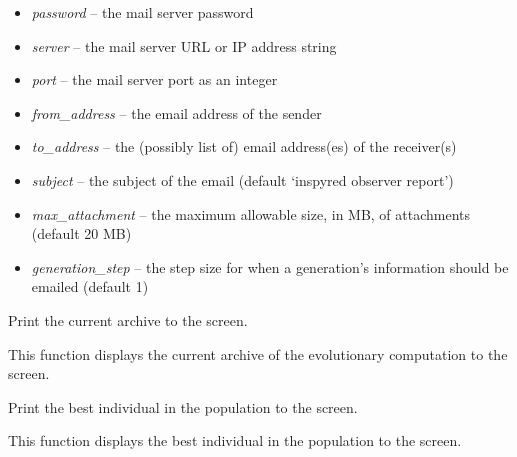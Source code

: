 \documentclass[letterpaper,10pt,english]{sphinxmanual}
\begin{document}
\begin{fulllineitems}
\begin{itemize}
\item {} 
\emph{password} -- the mail server password

\item {} 
\emph{server} -- the mail server URL or IP address string

\item {} 
\emph{port} -- the mail server port as an integer

\item {} 
\emph{from\_address} -- the email address of the sender

\item {} 
\emph{to\_address} -- the (possibly list of) email address(es) of the receiver(s)

\item {} 
\emph{subject} -- the subject of the email (default `inspyred observer report')

\item {} 
\emph{max\_attachment} -- the maximum allowable size, in MB, of attachments
(default 20 MB)

\item {} 
\emph{generation\_step} -- the step size for when a generation's information 
should be emailed (default 1)

\end{itemize}

\end{fulllineitems}


\begin{fulllineitems}
\label{reference:inspyred.ec.observers.archive_observer}
Print the current archive to the screen.

This function displays the current archive of the evolutionary 
computation to the screen.

\end{fulllineitems}


\begin{fulllineitems}
\label{reference:inspyred.ec.observers.best_observer}
Print the best individual in the population to the screen.

This function displays the best individual in the population to 
the screen.

\end{fulllineitems}
\end{document}
